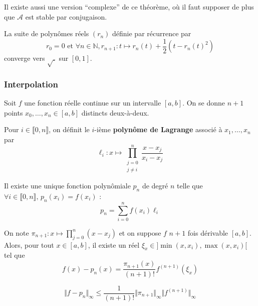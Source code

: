 	\begin{remark}
		Il existe aussi une version ``complexe'' de ce théorème, où il faut supposer de plus que $\mathcal{A}$ est stable par conjugaison.
	\end{remark}

	\begin{example}
		La suite de polynômes réels $(r_n)$ définie par récurrence par
		\[ r_0 = 0 \text{ et } \forall n \in \mathbb{N}, r_{n+1} : t \mapsto r_n(t) + \frac{1}{2} (t - r_n(t)^2) \]
		converge vers $\sqrt{.}$ sur $[0,1]$.
	\end{example}

	\subsubsection{Interpolation}


	Soit $f$ une fonction réelle continue sur un intervalle $[a,b]$. On se donne $n+1$ points $x_0, \dots, x_n \in [a,b]$ distincts deux-à-deux.

	\begin{definition}
		Pour $i \in \llbracket 0, n \rrbracket$, on définit le $i$-ième \textbf{polynôme de Lagrange} associé à $x_1, \dots, x_n$ par
		\[ \ell_i : x \mapsto \prod_{\substack{j=0\\j \neq i}}^n \frac{x-x_j}{x_i-x_j} \]
	\end{definition}

	\begin{theorem}
		Il existe une unique fonction polynômiale $p_n$ de degré $n$ telle que $\forall i \in \llbracket 0, n \rrbracket, \, p_n(x_i) = f(x_i)$ :
		\[ p_n = \sum_{i=0}^n f(x_i) \ell_i \]
	\end{theorem}

	\begin{theorem}
		On note $\pi_{n+1} : x \mapsto \prod_{j=0}^{n} (x-x_j)$ et on suppose $f$ $n+1$ fois dérivable $[a,b]$. Alors, pour tout $x \in [a,b]$, il existe un réel $\xi_x \in ]\min(x,x_i),\max(x,x_i)[$ tel que
		\[ f(x)-p_n(x) = \frac{\pi_{n+1}(x)}{(n+1)!} f^{(n+1)}(\xi_x) \]
	\end{theorem}

	\begin{corollary}
		\[ \Vert f - p_n \Vert_\infty \leq \frac{1}{(n+1)!} \Vert \pi_{n+1} \Vert_\infty \Vert f^{(n+1)} \Vert_\infty \]
	\end{corollary}


